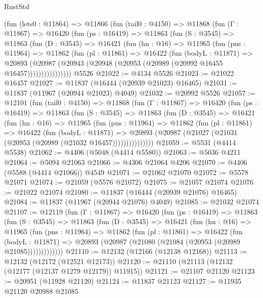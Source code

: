 \begin{lexlean}{RustStd}
\begin{coremodule}
{\begin{coremodule}
{{{{{{{{{{{{{{{{{{{{{{{{{{{{{{{{{{{{{{{{{{{{{{{{{{    (fun (lets0 : @11864) =>
    @11866
      (fun (tail0 : @4150) =>
      @11868
        (fun (Γ : @11867) =>
        @16420
          (fun (ps : @16419) =>
          @11863
            (fun (S : @3545) =>
            @11863
              (fun (D : @3545) =>
              @16421
                (fun (hn : @16) =>
                @11965
                  (fun (pns : @11964) =>
                  @11862
                    (fun (pl : @11861) =>
                    @16422
                      (fun (bodyL : @11871) =>
                      @20893
                        (@20987
                          (@20943 (@20948 (@20953 (@20989 (@20992 @16455 @16457))))))))))))))))
    @5526
@21022 := @4134 @5526
@21023 := @21022 @16457
@21027 := @11837 (@16444 (@20939 @21023) @16465)
@21031 := @11837 (@11967 (@20944 @21023) @4049)
@21032 := @20992 @5526
@21057 := @12101
    (fun (tail0 : @4150) =>
    @11868
      (fun (Γ : @11867) =>
      @16420
        (fun (ps : @16419) =>
        @11863
          (fun (S : @3545) =>
          @11863
            (fun (D : @3545) =>
            @16421
              (fun (hn : @16) =>
              @11965
                (fun (pns : @11964) =>
                @11862
                  (fun (pl : @11861) =>
                  @16422
                    (fun (bodyL : @11871) =>
                    @20893 (@20987 (@21027 (@21031 (@20953 (@20989 (@21032 @16457)))))))))))))))
@21059 := @5531 (@4414 @5538)
@21062 := @4406 (@5048 (@4414 @5580))
@21063 := @5036 @4211
@21064 := @5094 @21063
@21066 := @4306 @21064 @4206
@21070 := @4406 (@5588 (@4414 @21066)) @4549
@21071 := @21062 @21070
@21072 := @5578 @21071
@21074 := @21059 (@5576 @21072)
@21075 := @21057 @21074
@21076 := @21022 @21074
@21080 := @11837 (@16444 (@20939 @21076) @16465)
@21084 := @11837 (@11967 (@20944 @21076) @4049)
@21085 := @21032 @21074
@21107 := @12119
    (fun (Γ : @11867) =>
    @16420
      (fun (ps : @16419) =>
      @11863
        (fun (S : @3545) =>
        @11863
          (fun (D : @3545) =>
          @16421
            (fun (hn : @16) =>
            @11965
              (fun (pns : @11964) =>
              @11862
                (fun (pl : @11861) =>
                @16422
                  (fun (bodyL : @11871) =>
                  @20893 (@20987 (@21080 (@21084 (@20953 (@20989 @21085)))))))))))))
@21110 := @12132 (@12166 (@12138 @12168))
@21113 := @12132 (@12172 (@12521 @12173))
@21120 := @21110 (@21113 (@12132 (@12177 (@12137 @1279 @12179)) @11915))
@21121 := @21107 @21120
@21123 := @20951 (@11928 @21120)
@21124 := @11837 @21123
@21127 := @11935 @21120 @20988 @21085
}}}}}}}}}}}}}}}}}}}}}}}}}}}}}}}}}}}}}}}}}}}}}}}}}}
\end{coremodule}}
\end{coremodule}
\end{lexlean}
